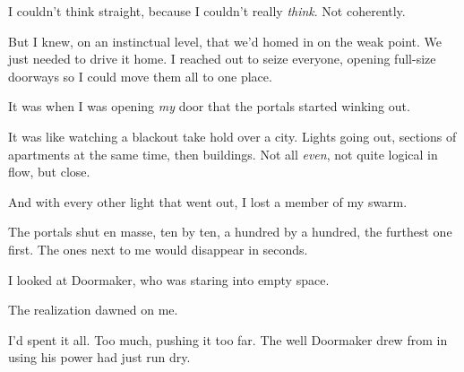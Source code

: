 I couldn't think straight, because I couldn't really \emph{think}.  Not coherently.



But I knew, on an instinctual level, that we'd homed in on the weak point.  We just needed to drive it home.  I reached out to seize everyone, opening full-size doorways so I could move them all to one place.



It was when I was opening \emph{my} door that the portals started winking out.



It was like watching a blackout take hold over a city.  Lights going out, sections of apartments at the same time, then buildings.  Not all \emph{even}, not quite logical in flow, but close.



And with every other light that went out, I lost a member of my swarm.



The portals shut en masse, ten by ten, a hundred by a hundred, the furthest one first.  The ones next to me would disappear in seconds.



I looked at Doormaker, who was staring into empty space.



The realization dawned on me.



I'd spent it all.  Too much, pushing it too far.  The well Doormaker drew from in using his power had just run dry.





